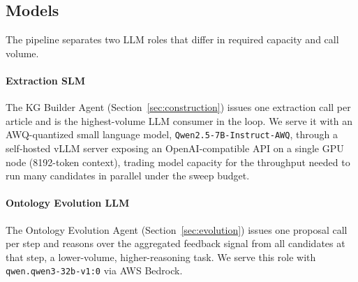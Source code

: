 \subsection{Models}
\label{sec:models}

The pipeline separates two LLM roles that differ in required capacity and call volume.

\paragraph{Extraction SLM}
The KG Builder Agent (Section~\ref{sec:construction}) issues one extraction call per article and
is the highest-volume LLM consumer in the loop.
We serve it with an AWQ-quantized small language model, \texttt{Qwen2.5-7B-Instruct-AWQ}, through
a self-hosted vLLM server exposing an OpenAI-compatible API on a single GPU node (8192-token
context), trading model capacity for the throughput needed to run many candidates in parallel
under the sweep budget.

\paragraph{Ontology Evolution LLM}
The Ontology Evolution Agent (Section~\ref{sec:evolution}) issues one proposal call per step and
reasons over the aggregated feedback signal from all candidates at that step, a lower-volume,
higher-reasoning task.
We serve this role with \texttt{qwen.qwen3-32b-v1:0} via AWS Bedrock.

